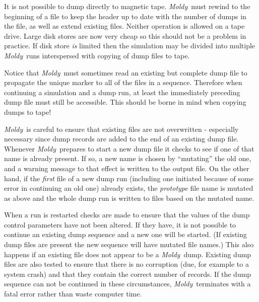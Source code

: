 \documentclass[a4paper,twoside]{report}
\newcommand{\moldy}{\emph{Moldy}}
\begin{document}
It is not possible to dump directly to magnetic tape. \moldy\ must
rewind to the beginning of a file to keep the header up to date with
the number of dumps in the file, as well as extend existing files.
Neither operation is allowed on a tape drive.  Large disk stores are
now very cheap so this should not be a problem in practice.  If disk
store \emph{is} limited then the simulation may be divided into
multiple \moldy\ runs interspersed with copying of dump files to
tape.

Notice that \moldy\  must sometimes read an existing but complete dump
file to propagate the unique marker to all of the files in a sequence.
Therefore when continuing a simulation and a dump run, at least
the immediately preceding dump file must still be accessible.  This
should be borne in mind when copying dumps to tape!

\moldy\  is careful to ensure that existing files are not
overwritten - especially necessary since dump records are added to
the end of an existing dump file.  Whenever \moldy\  prepares to start a
new dump file it checks to see if one of that name is already present.
If so, a new name is chosen by ``mutating'' the old one, and a warning
message to that effect is written to the output file. On the other
hand, if the \emph{first} file of a new dump run (including one
initiated because of some error in continuing an old one) already
exists, the \emph{prototype} file name is mutated as above and the
whole dump run is written to files based on the mutated name.

When a run is restarted checks are made to ensure that the values of
the dump control parameters have not been altered.  If they
have, it is not possible to continue an existing dump sequence and a
new one will be started.  (If existing dump files are present the new
sequence will have mutated file names.)  This also happens if an
existing file does not appear to be a \moldy\  dump.  Existing dump
files are also tested to ensure that there is no corruption (due, for
example to a system crash) and that they contain the correct number of
records.  If the dump sequence can not be continued in these
circumstances, \moldy\  terminates with a fatal error rather than waste
computer time.

\end{document}
